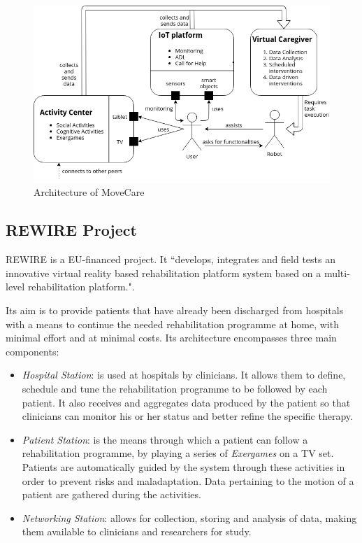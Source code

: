 \documentclass[12pt,a4paper,oneside]{report}
\begin{document}
\begin{figure}[H]
\begin{center}
\includegraphics[width=13cm]{giraffmovecare}
\caption{Architecture of MoveCare \cite{movecareimage}}
 \label{fig:movecare}
 \end{center}
\end{figure}

\pagebreak

\subsection{REWIRE Project}
REWIRE \cite{rewire} is a EU-financed project. It ``develops, integrates and field tests an innovative virtual reality based rehabilitation platform system based on a multi-level rehabilitation platform.".

Its aim is to provide patients that have already been discharged from hospitals with a means to continue the needed rehabilitation programme at home, with minimal effort and at minimal costs. Its architecture encompasses three main components:

\begin{itemize}\setlength{\itemsep}{8pt}
\item \textit{Hospital Station}: is used at hospitals by clinicians. It allows them to define, schedule and tune the rehabilitation programme to be followed by each patient. It also receives and aggregates data produced by the patient so that clinicians can monitor his or her status and better refine the specific therapy.
\item \textit{Patient Station}: is the means through which a patient can follow a rehabilitation programme, by playing a series of \textit{Exergames} on a TV set. Patients are automatically guided by the system through these activities in order to prevent risks and maladaptation. Data pertaining to the motion of a patient are gathered during the activities.
\item \textit{Networking Station}: allows for collection, storing and analysis of data, making them available to clinicians and researchers for study.
\end{itemize}
\end{document}
